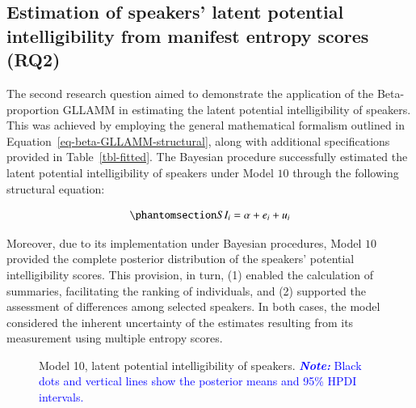 \documentclass[
  authoryear,
  preprint,
  1p]{elsarticle}
\begin{document}
\subsection{Estimation of speakers' latent potential intelligibility
from manifest entropy scores (RQ2)}\label{sec-R-RQ2}

The second research question aimed to demonstrate the application of the
Beta-proportion GLLAMM in estimating the latent potential
intelligibility of speakers. This was achieved by employing the general
mathematical formalism outlined in
Equation~\ref{eq-beta-GLLAMM-structural}, along with additional
specifications provided in Table~\ref{tbl-fitted}. The Bayesian
procedure successfully estimated the latent potential intelligibility of
speakers under Model \(10\) through the following structural equation:

\begin{equation}\phantomsection\label{eq-beta-GLLAMM-structural-model10}{
SI_{i} = \alpha + e_{i} + u_{i}
}\end{equation}

Moreover, due to its implementation under Bayesian procedures, Model
\(10\) provided the complete posterior distribution of the speakers'
potential intelligibility scores. This provision, in turn, (1) enabled
the calculation of summaries, facilitating the ranking of individuals,
and (2) supported the assessment of differences among selected speakers.
In both cases, the model considered the inherent uncertainty of the
estimates resulting from its measurement using multiple entropy scores.

\label{cell-fig-rq2-si-model10}
\begin{figure}[H]


\caption{\label{fig-rq2-si-model10}Model 10, latent potential
intelligibility of speakers. \textcolor{blue}{\textbf{\emph{Note:}} Black dots and
vertical lines show the posterior means and 95\% HPDI intervals.}}

\end{figure}%
\end{document}
